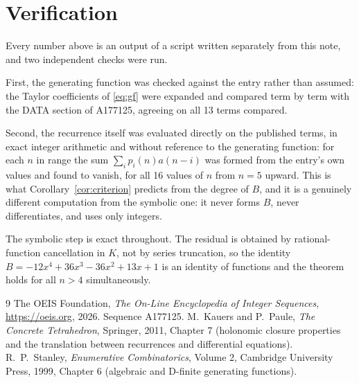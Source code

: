 \documentclass[11pt,a4paper]{article}
\theoremstyle{plain}
\theoremstyle{definition}
\begin{document}
\section{Verification}

Every number above is an output of a script written separately from this note, and two
independent checks were run.

First, the generating function was checked against the entry rather than assumed: the
Taylor coefficients of \eqref{eq:gf} were expanded and compared term by term with the DATA
section of A177125, agreeing on all 13 terms compared.

Second, the recurrence itself was evaluated directly on the published terms, in exact
integer arithmetic and without reference to the generating function: for each $n$ in range
the sum $\sum_{i}p_{i}(n)a(n-i)$ was formed from the entry's own values and found to
vanish, for all 16 values of $n$ from $n=5$ upward. This is what
Corollary~\ref{cor:criterion} predicts from the degree of $B$, and it is a genuinely
different computation from the symbolic one: it never forms $B$, never differentiates, and
uses only integers.

The symbolic step is exact throughout. The residual is obtained by rational-function
cancellation in $K$, not by series truncation, so the identity $B=- 12 x^{4} + 36 x^{3} - 36 x^{2} + 13 x + 1$ is an
identity of functions and the theorem holds for all $n>4$ simultaneously.

\begin{thebibliography}{9}
 The OEIS Foundation, \emph{The On-Line Encyclopedia of Integer Sequences},
\url{https://oeis.org}, 2026. Sequence A177125.
 M.~Kauers and P.~Paule, \emph{The Concrete Tetrahedron}, Springer, 2011,
Chapter 7 (holonomic closure properties and the translation between recurrences and
differential equations).
 R.~P.~Stanley, \emph{Enumerative Combinatorics}, Volume 2, Cambridge
University Press, 1999, Chapter 6 (algebraic and D-finite generating functions).
\end{thebibliography}
\end{document}
